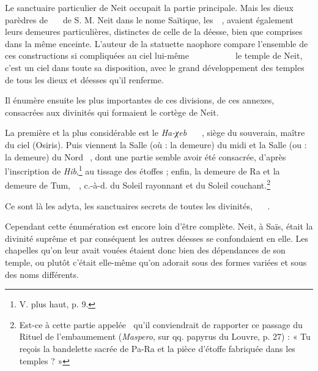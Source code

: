 \documentclass[a4paper, 11pt, oneside]{article}
\newcommand*\hieroAAAH{}
\newcommand*\hieroAAAO{}
\newcommand*\hieroAAAU{}
\newcommand*\hieroAAAX{}
\newcommand*\hieroAABC{\raisebox{0.5ex}{}}
\newcommand*\hieroAABR{}
\newcommand*\hieroAACN{\raisebox{1ex}{}}
\newcommand*\hieroAACS{}
\newcommand*\hieroAADB{}
\newcommand*\hieroAAEK{}
\newcommand*\hieroAAEZ{}
\newcommand*\hieroAAFW{}
\newcommand*\hieroAAHA{}
\newcommand*\hieroAAHC{}
\newcommand*\hieroAAHK{}
\newcommand*\hieroAAHN{}
\newcommand*\hieroAAHO{}
\newcommand*\hieroAAHP{}
\newcommand*\hieroAAHQ{}
\newcommand*\hieroAAHR{}
\newcommand*\hieroAAHS{}
\newcommand*\hieroAAHT{}
\newcommand*\hieroAAHU{}
\newcommand*\hieroAAHV{}
\newcommand*\hieroAAHW{}
\newcommand*\hieroAAHX{}
\newcommand*\hieroAAHY{}
\newcommand*\hieroAAHZ{}
\newcommand*\hieroAAIA{\raisebox{0.3ex}{}}
\newcommand*\hieroAAIB{}
\newcommand*\hieroAAIC{}
\newcommand*\hieroAAID{}
\newcommand*\hieroAAIE{}
\newcommand*\hieroAAIF{}
\newcommand*\hieroAAIG{}
\newcommand*\hieroAAIH{}
\begin{document}
Le sanctuaire particulier de Neit occupait la partie principale. Mais les dieux parèdres de $\hieroAAHC\:\hieroAACS\:\hieroAADB\allowbreak\:\hieroAAAO\:\hieroAAHO\:\hieroAAHP$ de S. M. Neit dans le nome Saïtique, les $\hieroAAEK\:\hieroAAEK\:\hieroAAEK\:\hieroAAHP$, avaient également leurs demeures particulières, distinctes de celle de la déesse, bien que comprises dans la même enceinte. L'auteur de la statuette naophore compare l'ensemble de ces constructions si compliquées au ciel lui-même $\hieroAAAO\:\hieroAAHK\:\hieroAAHQ\allowbreak\:\hieroAABR\:\hieroAACS\:\hieroAAHR\allowbreak\:\hieroAAHS\:\hieroAAEZ\:\hieroAAHT\allowbreak\:\hieroAACS\:\hieroAAHR\:\hieroAAHU\allowbreak\:\hieroAAAO\:\hieroAAHA\:\hieroAAEK\allowbreak\:\hieroAAEK\:\hieroAAEK\:\hieroAAHV\:\hieroAABC\allowbreak\:\hieroAAAH\:\hieroAAHW\:\hieroAAHX$ le temple de Neit, c'est un ciel dans toute sa disposition, avec le grand développement des temples de tous les dieux et déesses qu'il renferme.

Il énumère ensuite les plus importantes de ces divisions, de ces annexes, consacrées aux divinités qui formaient le cortège de Neit.

La première et la plus considérable est le \emph{Ha-χeb} $\hieroAAFW\:\hieroAAHY\:\hieroAAAU\allowbreak\:\hieroAAHZ\:\hieroAAIA\allowbreak\:\hieroAAIB\:\hieroAAIC$, siège du souverain, maître du ciel (Osiris). Puis viennent la Salle (où : la demeure) du midi et la Salle (ou : la demeure) du Nord $\hieroAAAX\:\hieroAAID\:\hieroAAIE$, dont une partie semble avoir été consacrée, d'après l'inscription de \emph{Hib},\footnote{V. plus haut, p. 9.} au tissage des étoffes ; enfin, la demeure de Ra et la demeure de Tum, $\hieroAAHN\:\hieroAAIF\:\hieroAAHN\:\hieroAAIG$, c.-à-d. du Soleil rayonnant et du Soleil couchant.\footnote{Est-ce à cette partie appelée $\hieroAAHN\:\hieroAAIF$ qu'il conviendrait de rapporter ce passage du Rituel de l'embaumement (\emph{Maspero}, sur qq. papyrus du Louvre, p. 27) : « Tu reçois la bandelette sacrée de Pa-Ra et la pièce d'étoffe fabriquée dans les temples ? »}

Ce sont là les adyta, les sanctuaires secrets de toutes les divinités, $\hieroAAIH\:\hieroAAHZ\:\hieroAACN\allowbreak\:\hieroAAEK\:\hieroAAEK\allowbreak\:\hieroAAEK\:\hieroAABC$.

Cependant cette énumération est encore loin d'être complète. Neit, à Saïs, était la divinité suprême et par conséquent les autres déesses se confondaient en elle. Les chapelles qu'on leur avait vouées étaient donc bien des dépendances de son temple, ou plutôt c'était elle-même qu'on adorait sous des formes variées et sous des noms différents.
\end{document}
